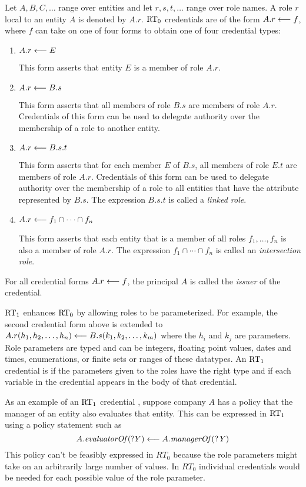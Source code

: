 Let $A, B, C, \ldots$ range over entities and let $r, s, t, \ldots$ range
over role names. A role $r$ local to an entity $A$ is denoted by $A.r$.
$\text{RT}_0$ credentials are of the form $A.r \stackrel{}{\longleftarrow} f$, 
where $f$ can take on one of four forms to obtain one of 
four credential types:
\begin{enumerate}

\item $A.r \stackrel{}{\longleftarrow} E$ 

 This form asserts that entity $E$ is a member of role $A.r$.

\item $A.r \stackrel{}{\longleftarrow} B.s$ 

  This form asserts that all members of role $B.s$ are members of role
  $A.r$. Credentials of this form can be used to delegate authority over
  the membership of a role to another entity.

\item $A.r \stackrel{}{\longleftarrow} B.s.t$ 

  This form asserts that for each member $E$ of $B.s$, all members of
  role $E.t$ are members of role $A.r$. Credentials of this form can be
  used to delegate authority over the membership of a role to all
  entities that have the attribute represented by $B.s$. The expression
  $B.s.t$ is called a \emph{linked role}.

\item $A.r \stackrel{}{\longleftarrow} f_1 \cap \cdots \cap f_n$
  
  This form asserts that each entity that is a member of all roles
  $f_1,\ldots, f_n$ is also a member of role $A.r$. The expression $f_1
  \cap \cdots \cap f_n$ is called an \emph{intersection role}.

\end{enumerate}
For all credential forms $A.r \stackrel{}{\longleftarrow} f$, the principal $A$ is called the
\emph{issuer} of the credential.

$\text{RT}_1$ enhances $\text{RT}_0$ by allowing roles to be parameterized. For
example, the second credential form above is extended to
$A.r(h_1, h_2, \ldots, h_n) \stackrel{}{\longleftarrow} B.s(k_1, k_2, \ldots, k_m)$
where the $h_i$ and $k_j$ are parameters. Role parameters are typed
and can be integers, floating point values, dates and times,
enumerations, or finite sets or ranges of these datatypes. An $\text{RT}_1$
credential is  if the parameters given to the
roles have the right type and if each variable in the credential
appears in the body of that credential.

As an example of an $\text{RT}_1$ credential \cite{Li:DRBTMF}, suppose company $A$
has a policy that the manager of an entity also evaluates that entity. This
can be expressed in $\text{RT}_1$ using a policy statement such as
$$A.\mathit{evaluatorOf}(?Y) \stackrel{}{\longleftarrow} A.\mathit{managerOf(?Y)}$$
This policy can't be feasibly expressed in $RT_0$ because the role parameters
might take on an arbitrarily large number of values. In $RT_0$ individual
credentials would be needed for each possible value of the role parameter.

